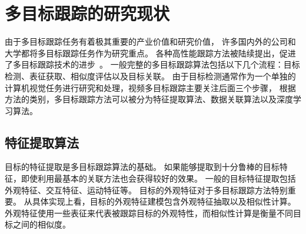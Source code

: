 \section{多目标跟踪的研究现状}
由于多目标跟踪任务有着极其重要的产业价值和研究价值，
许多国内外的公司和大学都将多目标跟踪任务作为研究重点。
各种高性能跟踪方法被陆续提出，促进了多目标跟踪技术的进步~\cite{xu2020how,chen2019aggregate}。
一般完整的多目标跟踪算法包括以下几个流程：目标检测、表征获取、相似度评估以及目标关联。
由于目标检测通常作为一个单独的计算机视觉任务进行研究和处理，视频多目标跟踪主要关注后面三个步骤，
根据方法的类别，多目标跟踪方法可以被分为特征提取算法、数据关联算法以及深度学习算法。

\subsection{特征提取算法}
目标的特征提取是多目标跟踪算法的基础。
如果能够提取到十分鲁棒的目标特征，即使利用最基本的关联方法也会获得较好的效果。
一般的目标特征提取包括外观特征、交互特征、运动特征等。
%
目标的外观特征对于多目标跟踪方法特别重要。
从具体实现上看，目标的外观特征建模包含外观特征抽取以及相似性计算。
外观特征使用一些表征来代表被跟踪目标的外观特性，而相似性计算是衡量不同目标之间的相似度。

